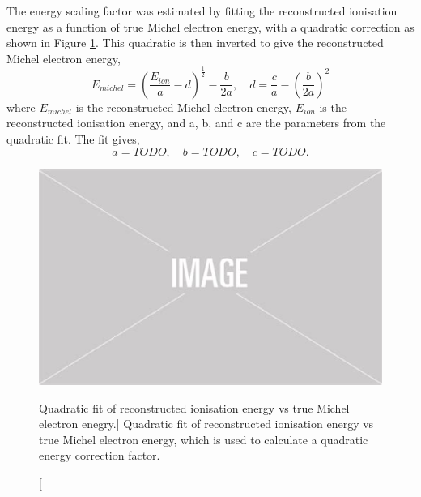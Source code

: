 The energy scaling factor was estimated by fitting the reconstructed ionisation
energy as a function of true Michel electron energy, with a quadratic 
correction as shown in Figure \ref{fig:quadratic_fit}. This quadratic is then 
inverted to give the reconstructed Michel electron energy,
\begin{equation}
	E_{michel} = \left( \frac{E_{ion}}{a} - d \right)^{\frac{1}{2}} - \frac{b}{2a},
	\quad d = \frac{c}{a} - \left( \frac{b}{2a} \right)^2 
\end{equation}
where $E_{michel}$ is the reconstructed Michel electron energy, $E_{ion}$ is the
reconstructed ionisation energy, and a, b, and c are the parameters from the
quadratic fit. The fit gives,
\begin{equation}
	a = TODO, \quad b = TODO, \quad c = TODO.
\end{equation}
\begin{figure}
	\centering
	\includegraphics[width=\textwidth]{figures/placeholder.png}
	\caption
	[Quadratic fit of reconstructed ionisation energy vs true Michel electron
	enegry.]
	{Quadratic fit of reconstructed ionisation energy vs true Michel electron
	energy, which is used to calculate a quadratic energy correction factor.}
	\label{fig:quadratic_fit}
\end{figure}

